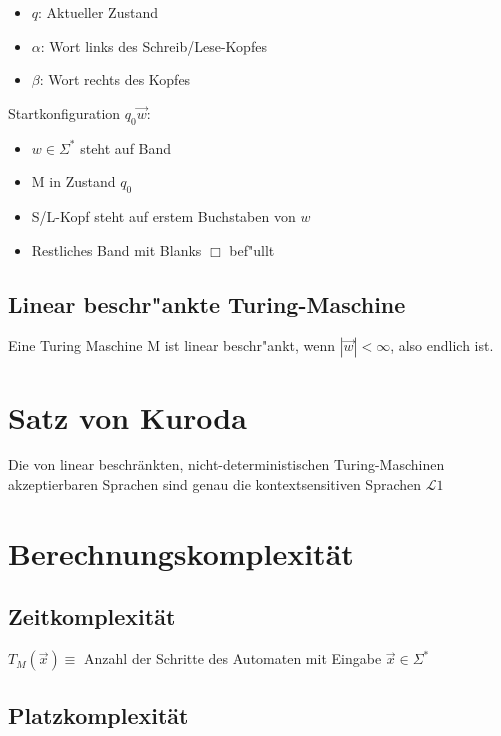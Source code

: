 \documentclass[11pt, a4paper]{scrartcl}
\begin{document}
\begin{itemize}
    \item $q$: Aktueller Zustand
    \item $\alpha$: Wort links des Schreib/Lese-Kopfes
    \item $\beta$: Wort rechts des Kopfes
\end{itemize}

\vspace{1em}

Startkonfiguration $q_0\vec{w}$:

\begin{itemize}
    \item $w \in \Sigma^*$ steht auf Band
    \item M in Zustand $q_0$
    \item S/L-Kopf steht auf erstem Buchstaben von $w$
    \item Restliches Band mit Blanks $\Box$ bef"ullt
\end{itemize}

\subsection{Linear beschr"ankte Turing-Maschine}

Eine Turing Maschine M ist linear beschr"ankt, wenn $|\vec{w}| < \infty$, also endlich ist.

\section{Satz von Kuroda}

Die von linear beschränkten, nicht-deterministischen Turing-Maschinen akzeptierbaren Sprachen sind genau die kontextsensitiven Sprachen $\mathcal{L}1$

\newpage



\section{Berechnungskomplexität}

\subsection{Zeitkomplexität}

$T_M(\vec{x}) \equiv$ Anzahl der Schritte des Automaten mit Eingabe $\vec{x} \in \Sigma^*$

\subsection{Platzkomplexität}
\end{document}
